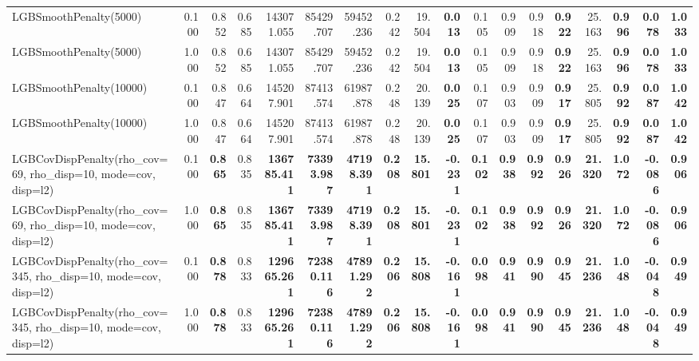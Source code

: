 \documentclass[11pt]{article}
\theoremstyle{plain}
\theoremstyle{definition}
\newcommand{\1}{\mathbf{1}}
\begin{document}
\begin{table}[htbp]
{\begin{tabular}{lrrrrrrrrrrrrrrrrr}
LGBSmoothPenalty(5000) & 0.100 & 0.852 & 0.685 & 143071.055 & 85429.707 & 59452.236 & 0.242 & 19.504 & \textbf{0.013} & 0.105 & 0.909 & 0.918 & \textbf{0.922} & 25.163 & \textbf{0.996} & \textbf{0.078} & \textbf{1.033} \\
LGBSmoothPenalty(5000) & 1.000 & 0.852 & 0.685 & 143071.055 & 85429.707 & 59452.236 & 0.242 & 19.504 & \textbf{0.013} & 0.105 & 0.909 & 0.918 & \textbf{0.922} & 25.163 & \textbf{0.996} & \textbf{0.078} & \textbf{1.033} \\
LGBSmoothPenalty(10000) & 0.100 & 0.847 & 0.664 & 145207.901 & 87413.574 & 61987.878 & 0.248 & 20.139 & \textbf{0.025} & 0.107 & 0.903 & 0.909 & \textbf{0.917} & 25.805 & \textbf{0.992} & \textbf{0.087} & \textbf{1.042} \\
LGBSmoothPenalty(10000) & 1.000 & 0.847 & 0.664 & 145207.901 & 87413.574 & 61987.878 & 0.248 & 20.139 & \textbf{0.025} & 0.107 & 0.903 & 0.909 & \textbf{0.917} & 25.805 & \textbf{0.992} & \textbf{0.087} & \textbf{1.042} \\
LGBCovDispPenalty(rho_cov=69, rho_disp=10, mode=cov, disp=l2) & 0.100 & \textbf{0.865} & 0.835 & \textbf{136785.411} & \textbf{73393.987} & \textbf{47198.391} & \textbf{0.208} & \textbf{15.801} & \textbf{-0.231} & \textbf{0.102} & \textbf{0.938} & \textbf{0.992} & \textbf{0.926} & \textbf{21.320} & \textbf{1.072} & \textbf{-0.086} & \textbf{0.906} \\
LGBCovDispPenalty(rho_cov=69, rho_disp=10, mode=cov, disp=l2) & 1.000 & \textbf{0.865} & 0.835 & \textbf{136785.411} & \textbf{73393.987} & \textbf{47198.391} & \textbf{0.208} & \textbf{15.801} & \textbf{-0.231} & \textbf{0.102} & \textbf{0.938} & \textbf{0.992} & \textbf{0.926} & \textbf{21.320} & \textbf{1.072} & \textbf{-0.086} & \textbf{0.906} \\
LGBCovDispPenalty(rho_cov=345, rho_disp=10, mode=cov, disp=l2) & 0.100 & \textbf{0.878} & 0.833 & \textbf{129665.261} & \textbf{72380.116} & \textbf{47891.292} & \textbf{0.206} & \textbf{15.808} & \textbf{-0.161} & \textbf{0.098} & \textbf{0.941} & \textbf{0.990} & \textbf{0.945} & \textbf{21.236} & \textbf{1.048} & \textbf{-0.048} & \textbf{0.949} \\
LGBCovDispPenalty(rho_cov=345, rho_disp=10, mode=cov, disp=l2) & 1.000 & \textbf{0.878} & 0.833 & \textbf{129665.261} & \textbf{72380.116} & \textbf{47891.292} & \textbf{0.206} & \textbf{15.808} & \textbf{-0.161} & \textbf{0.098} & \textbf{0.941} & \textbf{0.990} & \textbf{0.945} & \textbf{21.236} & \textbf{1.048} & \textbf{-0.048} & \textbf{0.949} \\

\end{tabular}}
\end{table}
\end{document}
